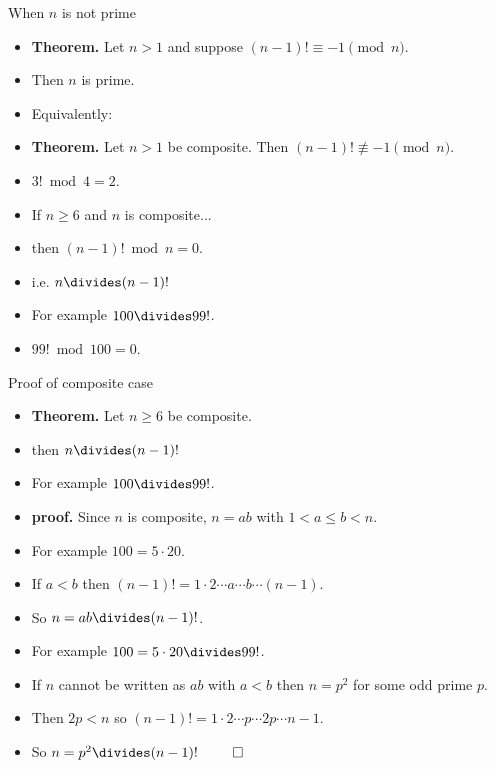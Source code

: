 \documentclass{beamer}
\begin{document}
\begin{frame}{When $n$ is not prime}

\begin{itemize}
  \item \textbf{Theorem.} Let $n>1$ and suppose $(n-1)! \equiv -1 \pmod n$.
  \item Then $n$ is prime.
  \item Equivalently:
  \item \textbf{Theorem.} Let $n>1$ be composite. Then $(n-1)! \not\equiv -1 \pmod n$.
  \item $3! \bmod 4 = 2$.
  \item If $n \geq 6$ and $n$ is composite...
  \item then $(n-1)! \bmod n = 0$.
  \item i.e. $n \divides (n-1)!$
  \item For example $100\divides 99!$.
  \item $99! \bmod 100 = 0$.
\end{itemize}

\end{frame}

\begin{frame}{Proof of composite case}

\begin{itemize}
  \item \textbf{Theorem.} Let $n \geq 6$ be composite.
  \item then $n \divides (n-1)!$
  \item For example $100\divides 99!$.
  \item \textbf{proof.} Since $n$ is composite, $n=ab$ with $1< a \leq b < n$.
  \item For example $100 = 5\cdot 20$.
  \item If $a<b$ then $(n-1)! = 1\cdot 2 \cdots a \cdots b \cdots (n-1)$.
  \item So $n=ab \divides (n-1)!$.
  \item For example $100 = 5\cdot 20 \divides 99!$.
  \item If $n$ cannot be written as $ab$ with $a<b$ then $n=p^2$ for some odd prime $p$.
  \item Then $2p < n$ so $(n-1)! = 1\cdot 2 \cdots p \cdots 2p \cdots n-1$.
  \item So $n=p^2 \divides (n-1)!$ $\qed$
\end{itemize}

\end{frame}
\end{document}
